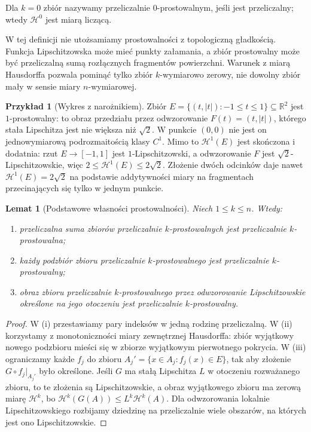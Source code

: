 \documentclass[11pt,a4paper,oneside]{book}
\numberwithin{equation}{chapter}
\theoremstyle{plain}
\newtheorem{lemat}[twierdzenie]{Lemat}
\theoremstyle{definition}
\newtheorem{przyklad}[twierdzenie]{Przykład}
\theoremstyle{remark}
\begin{document}
Dla $k=0$ zbiór nazywamy przeliczalnie $0$-prostowalnym,
jeśli jest przeliczalny; wtedy $\mathcal H^0$ jest miarą liczącą.

W tej definicji nie utożsamiamy prostowalności z topologiczną
gładkością. Funkcja Lipschitzowska może mieć punkty załamania,
a zbiór prostowalny może być przeliczalną sumą rozłącznych
fragmentów powierzchni. Warunek z miarą Hausdorffa pozwala
pominąć tylko zbiór $k$-wymiarowo zerowy, nie dowolny zbiór
mały w sensie miary $n$-wymiarowej.

\begin{przyklad}[Wykres z narożnikiem]
\label{ex:lip-graph-29}
Zbiór $E=\{(t,|t|):-1\le t\le1\}\subseteq\mathbb R^2$
jest $1$-prostowalny: to obraz przedziału przez odwzorowanie
$F(t)=(t,|t|)$, którego stała Lipschitza jest nie większa
niż $\sqrt2$. W punkcie $(0,0)$ nie jest on jednowymiarową
podrozmaitością klasy $C^1$. Mimo to $\mathcal H^1(E)$
jest skończona i dodatnia: rzut $E\to[-1,1]$ jest
$1$-Lipschitzowski, a odwzorowanie $F$ jest
$\sqrt2$-Lipschitzowskie, więc
$2\le\mathcal H^1(E)\le2\sqrt2$.
Złożenie dwóch odcinków daje nawet
$\mathcal H^1(E)=2\sqrt2$ na podstawie addytywności
miary na fragmentach przecinających się tylko w jednym punkcie.
\end{przyklad}

\begin{lemat}[Podstawowe własności prostowalności]
\label{lem:rectifiable-union-29}
Niech $1\le k\le n$. Wtedy:
\begin{enumerate}[label=(\roman*)]
\item przeliczalna suma zbiorów przeliczalnie
$k$-prostowalnych jest przeliczalnie $k$-prostowalna;
\item każdy podzbiór zbioru przeliczalnie
$k$-prostowalnego jest przeliczalnie $k$-prostowalny;
\item obraz zbioru przeliczalnie $k$-prostowalnego
przez odwzorowanie Lipschitzowskie określone na jego
otoczeniu jest przeliczalnie $k$-prostowalny.
\end{enumerate}
\end{lemat}
\begin{proof}
W (i) przestawiamy pary indeksów w jedną rodzinę
przeliczalną. W (ii) korzystamy z monotoniczności
miary zewnętrznej Hausdorffa: zbiór wyjątkowy
nowego podzbioru mieści się w zbiorze wyjątkowym
pierwotnego pokrycia. W (iii) ograniczamy każde $f_j$ do zbioru
$A_j' = \{x\in A_j:f_j(x)\in E\}$, tak aby złożenie
$G\circ f_j|_{A_j'}$ było określone. Jeśli $G$ ma stałą
Lipschitza $L$ w otoczeniu rozważanego zbioru,
to te złożenia są Lipschitzowskie, a obraz
wyjątkowego zbioru ma zerową miarę $\mathcal H^k$,
bo $\mathcal H^k(G(A))\le L^k\mathcal H^k(A)$.
Dla odwzorowania lokalnie Lipschitzowskiego rozbijamy
dziedzinę na przeliczalnie wiele obszarów, na których
jest ono Lipschitzowskie.
\end{proof}
\end{document}
